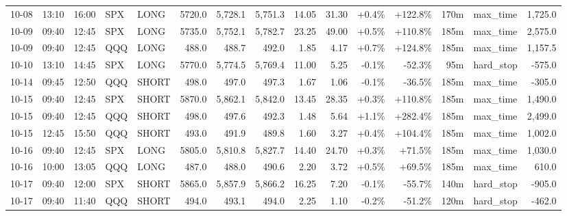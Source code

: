 \documentclass[11pt,a4paper,twoside]{article}
\begin{document}
\begin{landscape}
\begin{center}
\begin{longtable}{>{\color{txtmain}}l l l l l r r r r r r r r >{\color{txtmain}}l r}
10-08 & 13:10 & 16:00 & SPX & LONG & 5720.0 & 5,728.1 & 5,751.3 & 14.05 & 31.30 & \textcolor{wingreen}{+0.4\%} & \textcolor{wingreen}{+122.8\%} & 170m & max\_time & \textcolor{wingreen}{1,725.0} \\
10-09 & 09:40 & 12:45 & SPX & LONG & 5735.0 & 5,752.1 & 5,782.7 & 23.25 & 49.00 & \textcolor{wingreen}{+0.5\%} & \textcolor{wingreen}{+110.8\%} & 185m & max\_time & \textcolor{wingreen}{2,575.0} \\
10-09 & 09:40 & 12:45 & QQQ & LONG & 488.0 & 488.7 & 492.0 & 1.85 & 4.17 & \textcolor{wingreen}{+0.7\%} & \textcolor{wingreen}{+124.8\%} & 185m & max\_time & \textcolor{wingreen}{1,157.5} \\
10-10 & 13:10 & 14:45 & SPX & LONG & 5770.0 & 5,774.5 & 5,769.4 & 11.00 & 5.25 & \textcolor{lossred}{-0.1\%} & \textcolor{lossred}{-52.3\%} & 95m & hard\_stop & \textcolor{lossred}{-575.0} \\
10-14 & 09:45 & 12:50 & QQQ & SHORT & 498.0 & 497.0 & 497.3 & 1.67 & 1.06 & \textcolor{lossred}{-0.1\%} & \textcolor{lossred}{-36.5\%} & 185m & max\_time & \textcolor{lossred}{-305.0} \\
10-15 & 09:40 & 12:45 & SPX & SHORT & 5870.0 & 5,862.1 & 5,842.0 & 13.45 & 28.35 & \textcolor{wingreen}{+0.3\%} & \textcolor{wingreen}{+110.8\%} & 185m & max\_time & \textcolor{wingreen}{1,490.0} \\
10-15 & 09:40 & 12:45 & QQQ & SHORT & 498.0 & 497.6 & 492.3 & 1.48 & 5.64 & \textcolor{wingreen}{+1.1\%} & \textcolor{wingreen}{+282.4\%} & 185m & max\_time & \textcolor{wingreen}{2,499.0} \\
10-15 & 12:45 & 15:50 & QQQ & SHORT & 493.0 & 491.9 & 489.8 & 1.60 & 3.27 & \textcolor{wingreen}{+0.4\%} & \textcolor{wingreen}{+104.4\%} & 185m & max\_time & \textcolor{wingreen}{1,002.0} \\
10-16 & 09:40 & 12:45 & SPX & LONG & 5805.0 & 5,810.8 & 5,827.7 & 14.40 & 24.70 & \textcolor{wingreen}{+0.3\%} & \textcolor{wingreen}{+71.5\%} & 185m & max\_time & \textcolor{wingreen}{1,030.0} \\
10-16 & 10:00 & 13:05 & QQQ & LONG & 487.0 & 488.0 & 490.6 & 2.20 & 3.72 & \textcolor{wingreen}{+0.5\%} & \textcolor{wingreen}{+69.5\%} & 185m & max\_time & \textcolor{wingreen}{610.0} \\
10-17 & 09:40 & 12:00 & SPX & SHORT & 5865.0 & 5,857.9 & 5,866.2 & 16.25 & 7.20 & \textcolor{lossred}{-0.1\%} & \textcolor{lossred}{-55.7\%} & 140m & hard\_stop & \textcolor{lossred}{-905.0} \\
10-17 & 09:40 & 11:40 & QQQ & SHORT & 494.0 & 493.1 & 494.0 & 2.25 & 1.10 & \textcolor{lossred}{-0.2\%} & \textcolor{lossred}{-51.2\%} & 120m & hard\_stop & \textcolor{lossred}{-462.0} \\

\end{longtable}
\end{center}
\end{landscape}
\end{document}
